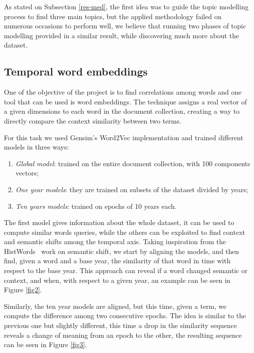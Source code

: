 As stated on Subsection \vref{res-med}, the first idea was to guide the topic modelling
process to find three main topics, but the applied methodology failed on numerous occasions to 
perform well, we believe that running two phases of topic modelling provided in a similar result, 
while discovering much more about the dataset. 

\subsection{Temporal word embeddings}

One of the objective of the project is to find correlations among words and one tool 
that can be used is word embeddings. The technique assigns a real vector of a given dimensions
to each word in the document collection, creating a way to directly compare the context 
similarity between two terms.

For this task we used Gensim's Word2Vec implementation and trained different models 
in three ways:
\begin{enumerate}
    \item \emph{Global model}: trained on the entire document collection, with 100 components vectors;
    \item \emph{One year models}: they are trained on subsets of the dataset divided by years;
    \item \emph{Ten years models}: trained on epochs of 10 years each.
\end{enumerate}
The first model gives information about the whole dataset, it can be used to compute 
similar words queries, while the others can be exploited to find context and semantic shifts 
among the temporal axis.
Taking inspiration from the HistWords~\cite{hist-words} work on semantic shift, we start by aligning the models, 
and then find, given a word and a base year, the similarity of that word in time with respect 
to the base year. This approach can reveal if a word changed semantic or context, and when, 
with respect to a given year, an example can be seen in Figure \vref{fig2}.

Similarly, the ten year models are aligned, but this time, given a term, we compute the 
difference among two consecutive epochs. The idea is similar to the previous one but slightly 
different, this time a drop in the similarity sequence 
reveals a change of meaning from an epoch to the other, the resulting 
sequence can be seen in Figure \vref{fig3}.

